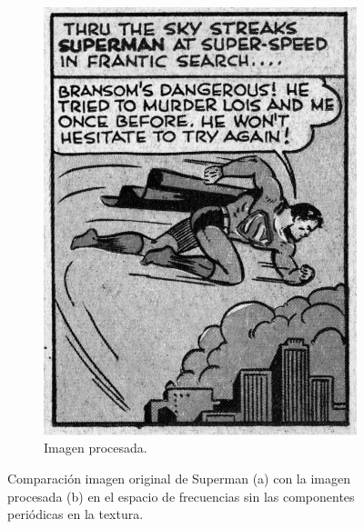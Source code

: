 \documentclass[11pt,twocolumn,twoside]{opticajnl}
\begin{document}
\begin{figure}[h]
\begin{subfigure}[h]{0.49\linewidth}
            \includegraphics[width=\textwidth]{Figuras/Inverse FFT of superman_process.png}
            \caption{Imagen procesada.}
         \end{subfigure}
    \caption{Comparación imagen original de Superman (a) con la imagen procesada (b) en el espacio de frecuencias sin las componentes periódicas en la textura.}
    \label{fig:superman}
\end{figure}
\end{document}
